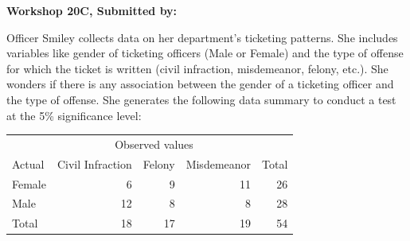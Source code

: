 \documentclass[11pt, chapterprefix=true]{scrbook}\usepackage[]{graphicx}\usepackage[]{color}
\begin{document}
\begin{exercises}
\begin{exercise}
\end{exercise}
\begin{solution}  %

\end{solution}


\clearpage

    \begin{exercise}  %

    \begin{center}
\begin{flushleft}\textbf{\large \hfill Workshop 20C, Submitted by: }\end{flushleft}

\end{center}

Officer Smiley collects data on her department's ticketing patterns. She includes variables like gender of ticketing officers (Male or Female) and the type of offense for which the ticket is written (civil infraction, misdemeanor, felony, etc.). She wonders if there is any association between the gender of a ticketing officer and the type of offense. She generates the following data summary to conduct a test at the 5\% significance level:

\begin{center}
\begin{tabular}{@{} lrrrr @{}} \hline
 & \multicolumn{3}{c}{Observed values} \\
Actual&	Civil Infraction&	Felony&	Misdemeanor&	Total  \\ \hline
Female&	6&	9&	11&	26 \\
Male&	12&	8&	8&	28 \\ \hline
Total&	18&	17&	19&	54 \\ \hline
\end{tabular}
\end{center}


\end{exercise}
\end{exercises}
\end{document}
